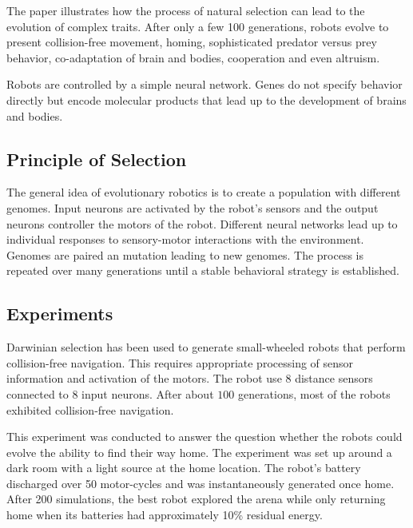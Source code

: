 \documentclass[../main.tex]{subfiles}
\begin{document}
\begin{mdframed}
\end{mdframed}

The paper illustrates how the process of natural selection can lead to the evolution of complex traits. After only a
few 100 generations, robots evolve to present collision-free movement, homing, sophisticated predator versus prey
behavior, co-adaptation of brain and bodies, cooperation and even altruism.

Robots are controlled by a simple neural network. Genes do not specify behavior directly but encode molecular products
that lead up to the development of brains and bodies.

\subsection{Principle of Selection}

The general idea of evolutionary robotics is to create a population with different genomes. Input neurons are activated
by the robot's sensors and the output neurons controller the motors of the robot. Different neural networks lead up to
individual responses to sensory-motor interactions with the environment. Genomes are paired an mutation leading to new
genomes. The process is repeated over many generations until a stable behavioral strategy is established.

\subsection{Experiments}

\begin{experiment}
Darwinian selection has been used to generate small-wheeled robots that perform collision-free navigation. This
requires appropriate processing of sensor information and activation of the motors. The robot use 8 distance sensors
connected to 8 input neurons. After about $100$ generations, most of the robots exhibited collision-free navigation.
\end{experiment}

\begin{experiment}
This experiment was conducted to answer the question whether the robots could evolve the ability to find their way
home. The experiment was set up around a dark room with a light source at the home location. The robot's battery
discharged over 50 motor-cycles and was instantaneously generated once home. After 200 simulations, the best robot
explored the arena while only returning home when its batteries had approximately 10\% residual energy.
\end{experiment}
\end{document}
